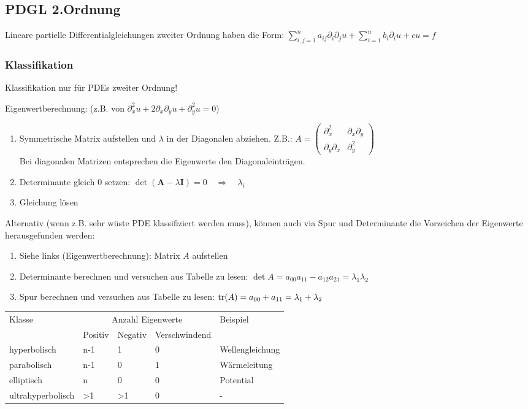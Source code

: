 \subsection{PDGL 2.Ordnung}
Lineare partielle Differentialgleichungen zweiter Ordnung haben die Form:
$\boxed{\sum\limits_{i,j=1}^{n}{a_{ij}\partial_i\partial_j u}+\sum\limits_{i=1}^{n}{b_i\partial_i u}+cu=f}$

\subsubsection{Klassifikation}
Klassifikation nur für PDEs zweiter Ordnung!

\begin{minipage}{9cm}
  Eigenwertberechnung: (z.B. von $ \partial^2_xu+2\partial_x\partial_yu+\partial^2_yu=0 $) 
  \begin{enumerate}
    \item Symmetrische Matrix aufstellen und $\lambda$ in der Diagonalen abziehen. Z.B.: $A = \begin{pmatrix}
      \partial_x^2 & \partial_x \partial_y \\
      \partial_y \partial_x  & \partial_y^2
    \end{pmatrix}$\\
    Bei diagonalen Matrizen entsprechen die Eigenwerte den Diagonaleinträgen.
    \item Determinante gleich 0 setzen: $\det(\mathbf{A}-\lambda \mathbf{I}) = 0\quad\Rightarrow\quad \lambda_i$
    \item Gleichung lösen
  \end{enumerate}
\end{minipage}
\begin{minipage}{9cm}
  Alternativ (wenn z.B. sehr wüste PDE klassifiziert werden muss), können auch via Spur und Determinante die Vorzeichen der Eigenwerte herausgefunden werden:
  \begin{enumerate}
    \item Siehe links (Eigenwertberechnung): Matrix $A$ aufstellen
    \item Determinante berechnen und versuchen aus Tabelle zu lesen:
     $\det A = a_{00}a_{11} - a_{12}a_{21} = \lambda_1 \lambda_2$
    \item Spur berechnen und versuchen aus Tabelle zu lesen:
      $\operatorname{tr}(A) = a_{00} + a_{11} = \lambda_1 + \lambda_2$
  \end{enumerate}
  
\end{minipage}

\begin{tabular}{|l||l|l|l|l|}
\hline
\multirow{2}{*}{Klasse}&\multicolumn{3}{|c|}{Anzahl Eigenwerte}&\multirow{2}{*}{Beispiel}\\
&Positiv&Negativ&Verschwindend&\\
\hline
hyperbolisch& n-1 & 1 & 0 & Wellengleichung\\
\hline
parabolisch& n-1 & 0 & 1 & Wärmeleitung\\
\hline
elliptisch&	n & 0 & 0 & Potential\\
\hline
ultrahyperbolisch & >1 & >1 & 0 & -\\
\hline
\end{tabular}
